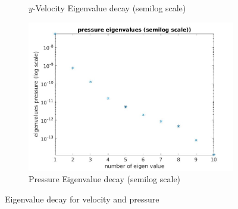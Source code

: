 \documentclass[a4paper,oneside,openright,spanish,english]{book}
\begin{document}
\begin{figure}
\begin{subfigure}{\textwidth}
  \caption{$y$-Velocity Eigenvalue decay (semilog scale)} 
  \label{eigen_value_decay_y_velocity_semilog_2}
  \includegraphics[width=\linewidth,height=0.3\textheight]{same_train_test/pressure_eigen_value_semilog.jpg}
  \caption{Pressure Eigenvalue decay (semilog scale)} 
  \label{eigen_value_decay_pressure_semilog_2}
\end{subfigure}
\caption{Eigenvalue decay for velocity and pressure}
\label{pod_eigenvalue_figure_semilog_2}
\end{figure}
\end{document}

